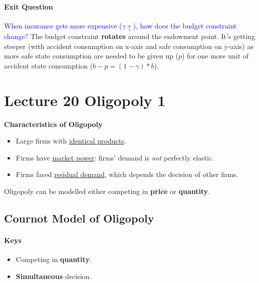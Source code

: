\documentclass[]{article}
\begin{document}
            \paragraph{Exit Question}
            \textcolor{blue}{When insurance gets more expensive ($\gamma \uparrow$), how does the budget constraint change?} The budget constraint \textbf{rotates} around the endowment point. It's getting steeper (with accident consumption on x-axis and safe consumption on y-axis) as more safe state consumption are needed to be given up ($p$) for one more unit of accident state consumption ($b - p = (1 - \gamma)*b$).
    
    \section{Lecture 20 Oligopoly 1}
        \begin{remark}
            \textbf{Characteristics of Oligopoly}
            \begin{itemize}
                \item Large firms with \ul{identical products}.
                \item Firms have \ul{market power}: firms' demand is \emph{not} perfectly elastic.
                \item Firms faced \ul{residual demand}, which depends the decision of other firms.
            \end{itemize}
        \end{remark}
        
        \begin{remark}
            Oligopoly can be modelled either competing in \textbf{price} or \textbf{quantity}.
        \end{remark}
        
        \subsection{Cournot Model of Oligopoly}
            \paragraph{Keys}
                \begin{itemize}
                    \item Competing in \textbf{quantity}.
                    \item \textbf{Simultaneous} decision.
                \end{itemize}
                
\end{document}

